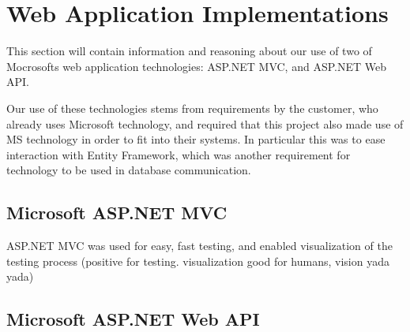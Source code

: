 \section{Web Application Implementations}

This section will contain information and reasoning about our use of two  of Mocrosofts
web application technologies: ASP.NET MVC, and ASP.NET Web API.

Our use of these technologies stems from requirements by the customer, who already uses Microsoft technology, and required that this project also made use of MS technology in order to fit into their systems. In particular this was to ease interaction with Entity Framework, which was another requirement for technology to be used in database communication. 

\subsection{Microsoft ASP.NET MVC}

ASP.NET MVC was used for easy, fast testing, and enabled visualization of the testing process (positive for testing. visualization good for humans, vision yada yada)%


\subsection{Microsoft ASP.NET Web API}
